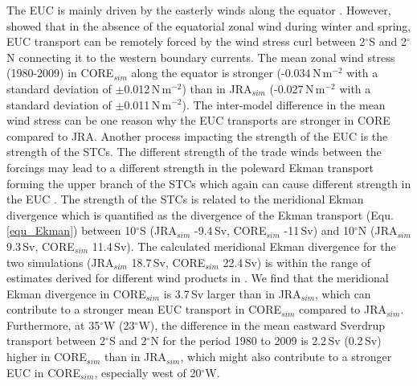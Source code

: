 \documentclass[os, manuscript]{copernicus}
\begin{document}
	The EUC is mainly driven by the easterly winds along the equator \citep{Pedlosky1987,Wacongne1989}. However, \cite{Arhan2006} showed that in the absence of the equatorial zonal wind during winter and spring, EUC transport can be remotely forced by the wind stress curl between 2$^{\circ}$S and 2$^{\circ}$N connecting it to the western boundary currents. The mean zonal wind stress (1980-2009) in CORE$_{sim}$ along the equator is stronger (-0.034$\,$N$\,$m$ ^{-2} $ with a standard deviation  of $ \pm $0.012$\,$N$\,$m$ ^{-2} $) than in JRA$_{sim}$ (-0.027$\,$N$\,$m$ ^{-2} $ with a standard deviation  of $ \pm $0.011$\,$N$\,$m$ ^{-2} $). The inter-model difference in the mean wind stress can be one reason why the EUC transports are stronger in CORE compared to JRA. Another process impacting the strength of the EUC is the strength of the STCs. The different strength of the trade winds between the forcings may lead to a different strength in the poleward Ekman transport forming the upper branch of the STCs which again can cause different strength in the EUC \citep{Rabe2008}. The strength of the STCs is related to the meridional Ekman divergence which is quantified as the divergence of the Ekman transport (Equ. \ref{equ_Ekman}) between 10$^{\circ}$S (JRA$_{sim}$ -9.4$\,$Sv, CORE$_{sim}$ -11$\,$Sv) and 10$^{\circ}$N (JRA$_{sim}$ 9.3$\,$Sv, CORE$_{sim}$ 11.4$\,$Sv). The calculated meridional Ekman divergence for the two simulations (JRA$_{sim}$ 18.7$\,$Sv, CORE$_{sim}$ 22.4$\,$Sv) is within the range of estimates derived for different wind products in \citet[][20.4$ \pm $3.1$\,$Sv]{Tuchen2019}. We find that the meridional Ekman divergence in CORE$_{sim}$ is 3.7$\,$Sv larger than in JRA$_{sim}$, which can contribute to a stronger mean EUC transport in CORE$_{sim}$ compared to JRA$_{sim}$. Furthermore, at 35$^{\circ}$W (23$^{\circ}$W), the difference in the mean eastward Sverdrup transport between 2$^{\circ}$S and 2$^{\circ}$N for the period 1980 to 2009 is 2.2$\,$Sv (0.2$\,$Sv) higher in CORE$_{sim}$ than in JRA$_{sim}$, which might also contribute to a stronger EUC in CORE$_{sim}$, especially west of 20$^{\circ}$W.
	
\end{document}
